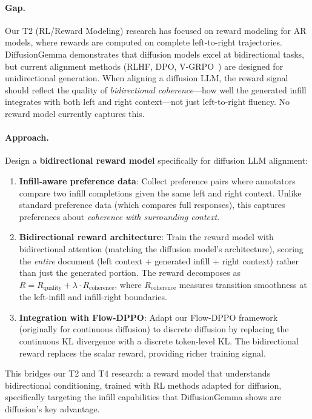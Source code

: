 \documentclass[11pt,a4paper]{article}
\begin{document}
\paragraph{Gap.} Our T2 (RL/Reward Modeling) research has focused on reward modeling for AR models, where rewards are computed on complete left-to-right trajectories. DiffusionGemma demonstrates that diffusion models excel at bidirectional tasks, but current alignment methods (RLHF, DPO, V-GRPO~\cite{vgrpo2026}) are designed for unidirectional generation. When aligning a diffusion LLM, the reward signal should reflect the quality of \emph{bidirectional coherence}---how well the generated infill integrates with both left and right context---not just left-to-right fluency. No reward model currently captures this.

\paragraph{Approach.} Design a \textbf{bidirectional reward model} specifically for diffusion LLM alignment:
\begin{enumerate}
\item \textbf{Infill-aware preference data}: Collect preference pairs where annotators compare two infill completions given the same left and right context. Unlike standard preference data (which compares full responses), this captures preferences about \emph{coherence with surrounding context}.
\item \textbf{Bidirectional reward architecture}: Train the reward model with bidirectional attention (matching the diffusion model's architecture), scoring the \emph{entire} document (left context + generated infill + right context) rather than just the generated portion. The reward decomposes as $R = R_{\mathrm{quality}} + \lambda \cdot R_{\mathrm{coherence}}$, where $R_{\mathrm{coherence}}$ measures transition smoothness at the left-infill and infill-right boundaries.
\item \textbf{Integration with Flow-DPPO}: Adapt our Flow-DPPO framework~\cite{flowdppo2026} (originally for continuous diffusion) to discrete diffusion by replacing the continuous KL divergence with a discrete token-level KL. The bidirectional reward replaces the scalar reward, providing richer training signal.
\end{enumerate}
This bridges our T2 and T4 research: a reward model that understands bidirectional conditioning, trained with RL methods adapted for diffusion, specifically targeting the infill capabilities that DiffusionGemma shows are diffusion's key advantage.
\end{document}

